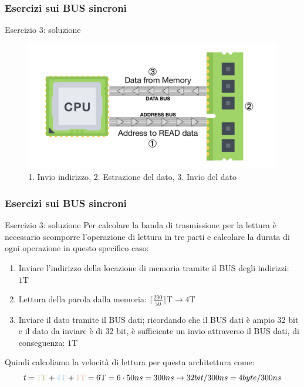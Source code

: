 \begin{frame}
	\frametitle{Esercizi sui BUS sincroni}
	
	\begin{block}{Esercizio 3: soluzione}
		\begin{figure}[!htbp]
			\centering
			\includegraphics[width=0.86\linewidth]{images/6_bus/bus_synch.pdf}
			\caption{{\color{CpuGreen}1. Invio indirizzo}, {\color{CpuBlue}2. Estrazione del dato}, {\color{CpuRed}3. Invio del dato}}
		\end{figure}
	\end{block}
\end{frame}


\begin{frame}
	\frametitle{Esercizi sui BUS sincroni}
	
	\begin{block}{Esercizio 3: soluzione}
		Per calcolare la banda di trasmissione per la lettura è necessario scomporre l'operazione di lettura in tre parti e calcolare la durata di ogni operazione in questo specifico caso:
		\begin{enumerate}
			\item {\color{CpuGreen}Inviare l'indirizzo della locazione di memoria tramite il BUS degli indirizzi: $1\mathrm{T}$}
			\item {\color{CpuBlue}Lettura della parola dalla memoria: $\Big\lceil \frac{200}{50} \Big\rceil \mathrm{T} \rightarrow 4\mathrm{T}$}
			\item {\color{CpuRed} Inviare il dato tramite il BUS dati; ricordando che il BUS dati è ampio 32 bit e il dato da inviare è di 32 bit, è sufficiente un invio attraverso il BUS dati, di conseguenza: $1\mathrm{T}$}
		\end{enumerate}
		Quindi calcoliamo la velocità di lettura per questa architettura come:
		$$t = {\color{CpuGreen}1\mathrm{T}} + {\color{CpuBlue}4\mathrm{T}} + {\color{CpuRed}1\mathrm{T}} = 6\mathrm{T} = 6 \cdot 50ns = 300ns \rightarrow 32bit/300ns = 4byte/300ns$$
	\end{block}
\end{frame}


